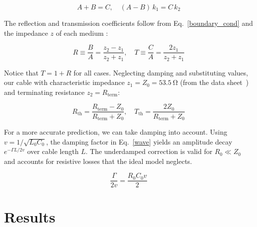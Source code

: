 \documentclass[11pt]{article}
\begin{document}
\begin{equation}
  \label{boundary_cond}
  A+B=C, \quad (A-B)\,k_1 = C\,k_2
\end{equation}

The reflection and transmission coefficients follow from Eq.~\eqref{boundary_cond} and the impedance $z$ of each medium \cite{georgi}:

\begin{equation}
  \label{coeff}
  R\equiv \frac{B}{A}= \frac{z_2-z_1}{z_2 + z_1}, \quad T\equiv \frac{C}{A}= \frac{2z_1}{z_2 + z_1}
\end{equation}

Notice that $T = 1 + R$ for all cases. Neglecting damping and substituting values, our cable with characteristic impedance $z_1=Z_0=\qty{53.5}{\ohm}$ (from the data sheet~\cite{spec}) and terminating resistance $z_2=R_\mathrm{term}$:

\begin{equation}
  \label{th_coeff}
  R_\mathrm{th}= \frac{R_\mathrm{term}-Z_0}{R_\mathrm{term} + Z_0}, \quad T_\mathrm{th}= \frac{2Z_0}{R_\mathrm{term} + Z_0}
\end{equation}

For a more accurate prediction, we can take damping into account. Using $v=1/\sqrt{L_0C_0}$, the damping factor in Eq.~\eqref{wave} yields an amplitude decay $e^{-\Gamma L/2v}$ over cable length $L$. The underdamped correction is valid for $R_0 \ll Z_0$ and accounts for resistive losses that the ideal model neglects.


\begin{equation}
  \label{damp_coeff}
  \frac{\Gamma}{2v}=\frac{R_0C_0 v}{2}
\end{equation}



\section{Results}\label{sec:results}
\end{document}
